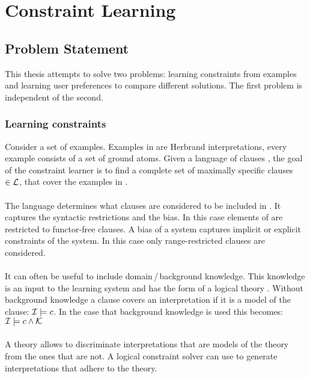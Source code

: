 \chapter{Constraint Learning}
\label{cha:cl}




\section{Problem Statement}
This thesis attempts to solve two problems: learning constraints from examples and learning user preferences to compare different solutions. The first problem is independent of the second.

\subsection{Learning constraints}
Consider a set  of examples. Examples in  are Herbrand interpretations, every example consists of a set of ground atoms. Given a language of clauses , the goal of the constraint learner is to find a complete set  of maximally specific clauses $\in \mathcal{L}$, that cover the examples in .
\\\\
The language  determines what clauses are considered to be included in . It captures the syntactic restrictions and the bias. In this case elements of  are restricted to functor-free clauses. A bias of a system captures implicit or explicit constraints of the system. In this case only range-restricted clauses are considered.
\\\\
It can often be useful to include domain\,/\,background knowledge. This knowledge is an input to the learning system and has the form of a logical theory . Without background knowledge a clause  covers an interpretation  if it is a model of the clause: $\mathcal{I} \models c$. In the case that background knowledge is used this becomes: $\mathcal{I} \models c \land \mathcal{K}$
\\\\
A theory  allows to discriminate interpretations that are models of the theory from the ones that are not. A logical constraint solver can use  to generate interpretations that adhere to the theory.

